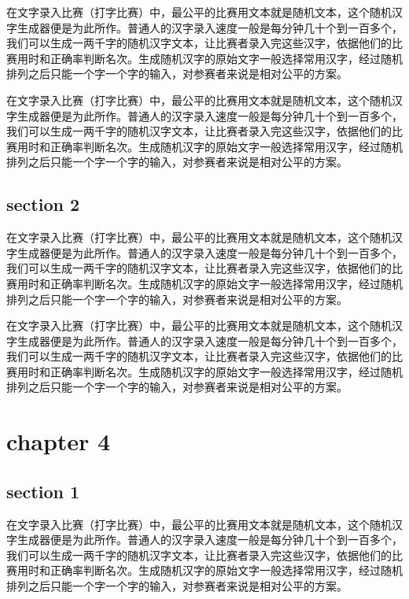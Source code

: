 \documentclass[12pt,hyperref,UTF8]{ctexbook}
\begin{document}
在文字录入比赛（打字比赛）中，最公平的比赛用文本就是随机文本，这个随机汉字生成器便是为此所作。普通人的汉字录入速度一般是每分钟几十个到一百多个，我们可以生成一两千字的随机汉字文本，让比赛者录入完这些汉字，依据他们的比赛用时和正确率判断名次。生成随机汉字的原始文字一般选择常用汉字，经过随机排列之后只能一个字一个字的输入，对参赛者来说是相对公平的方案。

在文字录入比赛（打字比赛）中，最公平的比赛用文本就是随机文本，这个随机汉字生成器便是为此所作。普通人的汉字录入速度一般是每分钟几十个到一百多个，我们可以生成一两千字的随机汉字文本，让比赛者录入完这些汉字，依据他们的比赛用时和正确率判断名次。生成随机汉字的原始文字一般选择常用汉字，经过随机排列之后只能一个字一个字的输入，对参赛者来说是相对公平的方案。

\section{section 2}

在文字录入比赛（打字比赛）中，最公平的比赛用文本就是随机文本，这个随机汉字生成器便是为此所作。普通人的汉字录入速度一般是每分钟几十个到一百多个，我们可以生成一两千字的随机汉字文本，让比赛者录入完这些汉字，依据他们的比赛用时和正确率判断名次。生成随机汉字的原始文字一般选择常用汉字，经过随机排列之后只能一个字一个字的输入，对参赛者来说是相对公平的方案。

在文字录入比赛（打字比赛）中，最公平的比赛用文本就是随机文本，这个随机汉字生成器便是为此所作。普通人的汉字录入速度一般是每分钟几十个到一百多个，我们可以生成一两千字的随机汉字文本，让比赛者录入完这些汉字，依据他们的比赛用时和正确率判断名次。生成随机汉字的原始文字一般选择常用汉字，经过随机排列之后只能一个字一个字的输入，对参赛者来说是相对公平的方案。

\cleardoublepage
\chapter{chapter 4}

\section{section 1}

在文字录入比赛（打字比赛）中，最公平的比赛用文本就是随机文本，这个随机汉字生成器便是为此所作。普通人的汉字录入速度一般是每分钟几十个到一百多个，我们可以生成一两千字的随机汉字文本，让比赛者录入完这些汉字，依据他们的比赛用时和正确率判断名次。生成随机汉字的原始文字一般选择常用汉字，经过随机排列之后只能一个字一个字的输入，对参赛者来说是相对公平的方案。
\end{document}
